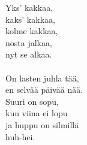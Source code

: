 
            Yks’ kakkaa, \\
            kaks’ kakkaa, \\
            kolme kakkaa, \\
            nosta jalkaa, \\
            nyt se alkaa. \\
\hspace{10mm} \\
            On lasten juhla tää, \\
            en selvää päivää nää. \\
            Suuri on sopu, \\
            kun viina ei lopu \\
            ja huppu on silmillä \\
            huh-hei. \\
